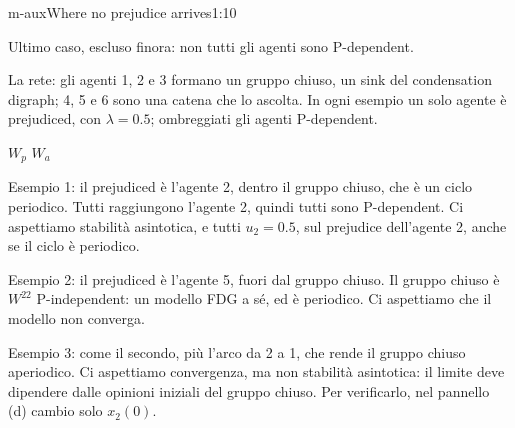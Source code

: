 \begin{slidedue}{m-aux}{Where no prejudice arrives}{1:10}
  \begin{discorso}
    \item {\color{red}     } {\color{blue}Ultimo caso,} escluso finora: non tutti gli agenti sono P-dependent.
    \item {\color{red}} {\color{blue}La rete: gli} agenti 1, 2 e 3 formano un gruppo chiuso, un sink del condensation digraph; 4, 5 e 6 sono una catena che lo ascolta. {\color{red}} {\color{blue}In ogni esempio un} solo agente è prejudiced, con $\lambda=0.5$; ombreggiati gli agenti P-dependent.
    \item {\color{red}} {\color{red}$W_p$} {\color{red}       } {\color{red}$W_a$} {\color{red}       }
    \item {\color{red}\clic} {\color{red}  } {\color{blue}Esempio 1:} il prejudiced è l'agente 2, dentro il gruppo chiuso, {\color{blue}che è un ciclo periodico. Tutti raggiungono l'agente 2, quindi} tutti sono P-dependent. {\color{red}    } {\color{blue}Ci aspettiamo stabilità asintotica,} e tutti {\color{red} } {\color{red}$u_2=0.5$,} {\color{blue}sul prejudice dell'agente 2,} anche se il ciclo è periodico.
    \item {\color{red}  } {\color{blue}Esempio 2:} il prejudiced è l'agente 5, {\color{red}      } {\color{blue}fuori dal gruppo chiuso.} Il gruppo chiuso è {\color{red}} {\color{red}$W^{22}$} {\color{red}} {\color{blue}P-independent: un modello FDG a sé, ed} è {\color{red} } {\color{blue}periodico. Ci aspettiamo che} il modello non {\color{red}    } {\color{blue}converga.}
    \item {\color{blue}Esempio 3: come il secondo, più l'arco da 2 a 1, che rende il gruppo chiuso aperiodico. Ci aspettiamo convergenza, ma non stabilità asintotica: il limite deve dipendere dalle opinioni iniziali del gruppo chiuso. Per verificarlo, nel pannello (d) cambio solo $x_2(0)$.}

\end{discorso}
\end{slidedue}
